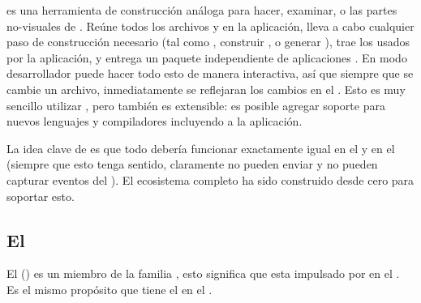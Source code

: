 \begin{itemize}
		\commandLinemeteor es una herramienta de construcción análoga para hacer, examinar, o las partes no-visuales de \visualstudio. Reúne todos los archivos y \assetsAS en la aplicación, lleva a cabo cualquier paso de construcción necesario (tal como \minifying \cssNAME, construir \modulesAS \npm, o generar \sourcemaps), trae los \packagesAS usados por la aplicación, y entrega un paquete independiente de aplicaciones \readytorun. En modo desarrollador puede hacer todo esto de manera interactiva, así que siempre que se cambie un archivo, inmediatamente se reflejaran los cambios en el \browserINT. Esto es muy sencillo utilizar \outofthebox, pero también es extensible: es posible agregar soporte para nuevos lenguajes y compiladores incluyendo \buildPL \pluginAS \packagesAS a la aplicación.

\end{itemize}

La idea clave de \meteorNAME \packageAS \system es que todo debería funcionar exactamente igual en el \browserINT y en el \serverAS (siempre que esto tenga sentido, claramente \browsersINT no pueden enviar \emails y \serversAS no pueden capturar eventos del \mousePC). El ecosistema completo ha sido construido desde cero para soportar esto.

\subsection{El \stackAS \meteorNAME}


El \stackAS \meteorNAME() es un miembro de la familia \meanstackNAME, esto significa que esta impulsado por \nodejsNAME en el \serverSideAS. Es el mismo propósito que tiene el \webserverINT \apacheNAME en el \stackAS \lampNAME.



